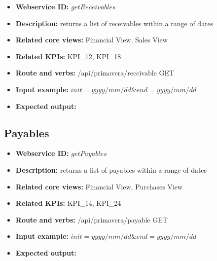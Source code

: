 \documentclass[a4paper]{article}
\begin{document}
\begin{itemize}
  \item \textbf{Webservice ID:} $getReceivables$
  \item \textbf{Description:} returns a list of receivables within a range of dates
  \item \textbf{Related core views:} Financial View, Sales View
  \item \textbf{Related KPIs:} KPI\_12, KPI\_18
  \item \textbf{Route and verbs:} /api/primavera/receivable GET
  \item \textbf{Input example:} $init=yyyy/mm/dd\&end=yyyy/mm/dd$
  \item \textbf{Expected output:} 

  
\end{itemize}


\subsection{Payables}

\begin{itemize}
  \item \textbf{Webservice ID:} $getPayables$
  \item \textbf{Description:} returns a list of payables within a range of dates
  \item \textbf{Related core views:} Financial View, Purchases View
  \item \textbf{Related KPIs:} KPI\_14, KPI\_24
  \item \textbf{Route and verbs:} /api/primavera/payable GET
  \item \textbf{Input example:} $init=yyyy/mm/dd\&end=yyyy/mm/dd$
  \item \textbf{Expected output:} 

  
\end{itemize}
\end{document}
